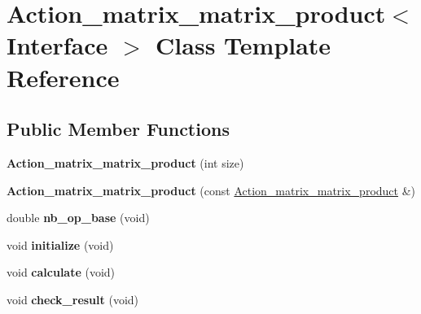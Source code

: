 \hypertarget{class_action__matrix__matrix__product}{}\section{Action\+\_\+matrix\+\_\+matrix\+\_\+product$<$ Interface $>$ Class Template Reference}
\label{class_action__matrix__matrix__product}
\subsection*{Public Member Functions}
\begin{DoxyCompactItemize}
\item 
\mbox{\label{class_action__matrix__matrix__product_a0bc88b3094f9090b3b5f8628b055b997}} 
{\bfseries Action\+\_\+matrix\+\_\+matrix\+\_\+product} (int size)
\item 
\mbox{\label{class_action__matrix__matrix__product_ab23b6d4d1cb67a8a8563567e668458ab}} 
{\bfseries Action\+\_\+matrix\+\_\+matrix\+\_\+product} (const \hyperlink{class_action__matrix__matrix__product}{Action\+\_\+matrix\+\_\+matrix\+\_\+product} \&)
\item 
\mbox{\label{class_action__matrix__matrix__product_a31850c978601ab51aa0fe21137729930}} 
double {\bfseries nb\+\_\+op\+\_\+base} (void)
\item 
\mbox{\label{class_action__matrix__matrix__product_a6e0e533210dded9acc7c0f8d4b095edc}} 
void {\bfseries initialize} (void)
\item 
\mbox{\label{class_action__matrix__matrix__product_a1b7c6d0e9a22ea29b2faeb0c9d83d593}} 
void {\bfseries calculate} (void)
\item 
\mbox{\label{class_action__matrix__matrix__product_a826885b0b0fb11fddbda7e8c36af31ab}} 
void {\bfseries check\+\_\+result} (void)
\item 
\mbox{\label{class_action__matrix__matrix__product_a0bc88b3094f9090b3b5f8628b055b997}} 

\end{DoxyCompactItemize}
